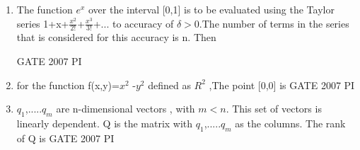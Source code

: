 \documentclass[journal,12pt,onecolumn]{IEEEtran}
\theoremstyle{remark}
\begin{document}
\begin{enumerate}
           \item
            The function $e^{x}$ over the interval [0,1] is to be evaluated using the Taylor series 1+x+$\frac{x^{2}}{2!}$+$\frac{x^{3}}{3!}$+... to accuracy of $\delta>0$.The number of terms in the series that is considered for this accuracy is n. Then


            \hfill{GATE 2007 PI}
            \begin{enumerate}
                 \end{enumerate}
            
            \item 
                 for the function f(x,y)=$x^{2}$ -$y^{2}$ defined as $R^{2}$ ,The point [0,0] is
                 \hfill{GATE 2007 PI}
                 \begin{enumerate}
                 \end{enumerate}

\item
$q_{1}$,.....$q_{m}$ are n-dimensional vectors , with $m < n$. This set of vectors is linearly dependent. Q is the matrix with $q_{1}$,.....$q_{m}$ as the columns. The rank of Q is
\hfill{GATE 2007 PI}
\begin{enumerate}
    \end{enumerate}
    

\end{enumerate}
\end{document}
